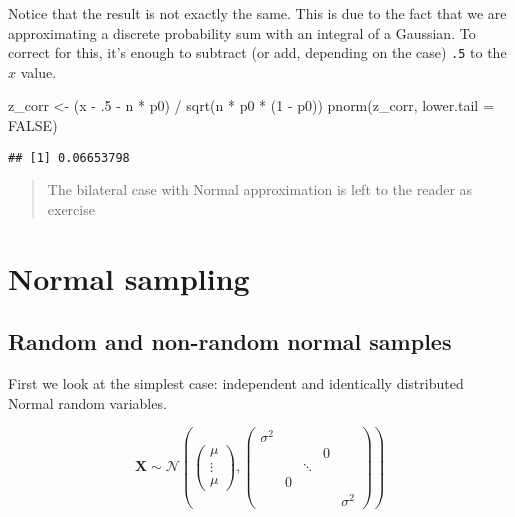 \documentclass[
  oneside]{book}
\newenvironment{Shaded}{\begin{snugshade}}{\end{snugshade}}
\newcommand{\AttributeTok}[1]{\textcolor[rgb]{0.77,0.63,0.00}{#1}}
\newcommand{\ConstantTok}[1]{\textcolor[rgb]{0.00,0.00,0.00}{#1}}
\newcommand{\DecValTok}[1]{\textcolor[rgb]{0.00,0.00,0.81}{#1}}
\newcommand{\FunctionTok}[1]{\textcolor[rgb]{0.00,0.00,0.00}{#1}}
\newcommand{\NormalTok}[1]{#1}
\newcommand{\OtherTok}[1]{\textcolor[rgb]{0.56,0.35,0.01}{#1}}
\newcommand{\SpecialCharTok}[1]{\textcolor[rgb]{0.00,0.00,0.00}{#1}}
\begin{document}
Notice that the result is not exactly the same. This is due to the fact
that we are approximating a discrete probability sum with an integral of
a Gaussian. To correct for this, it's enough to subtract (or add, depending
on the case) \texttt{.5} to the \(x\) value.

\begin{Shaded}
\begin{Highlighting}[]
\NormalTok{z\_corr }\OtherTok{\textless{}{-}}\NormalTok{ (x }\SpecialCharTok{{-}}\NormalTok{ .}\DecValTok{5} \SpecialCharTok{{-}}\NormalTok{ n }\SpecialCharTok{*}\NormalTok{ p0) }\SpecialCharTok{/} \FunctionTok{sqrt}\NormalTok{(n }\SpecialCharTok{*}\NormalTok{ p0 }\SpecialCharTok{*}\NormalTok{ (}\DecValTok{1} \SpecialCharTok{{-}}\NormalTok{ p0))}
\FunctionTok{pnorm}\NormalTok{(z\_corr, }\AttributeTok{lower.tail =} \ConstantTok{FALSE}\NormalTok{)}
\end{Highlighting}
\end{Shaded}

\begin{verbatim}
## [1] 0.06653798
\end{verbatim}

\begin{quote}
The bilateral case with Normal approximation is left to the reader as exercise
\end{quote}

\hypertarget{normal-sampling}{%
\chapter{Normal sampling}\label{normal-sampling}}

\hypertarget{random-and-non-random-normal-samples}{%
\section{Random and non-random normal samples}\label{random-and-non-random-normal-samples}}

First we look at the simplest case: independent and identically distributed
Normal random variables.

\[
\mathbf{X} \sim \mathcal{N}\left(
\begin{pmatrix}
\mu \\ \vdots \\ \mu
\end{pmatrix}, 
\begin{pmatrix}
\sigma^2 & & & & \\
 & & & 0 & \\
 & & \ddots & &  \\
 & 0 & & & \\
 & & & & \sigma^2
\end{pmatrix}
\right)
\]
\end{document}
